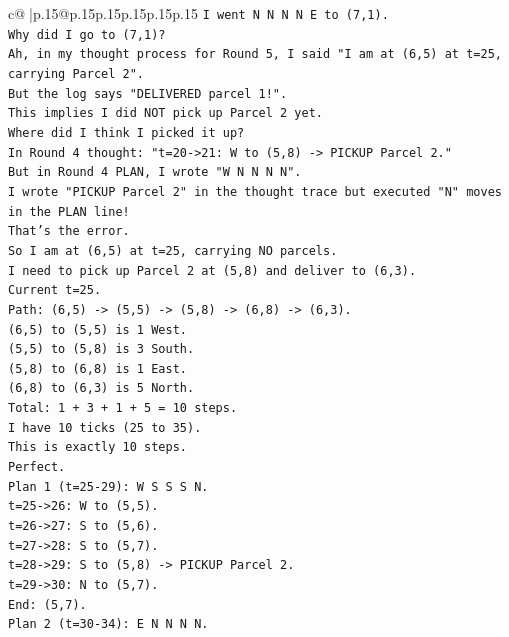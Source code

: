 \documentclass{article}
\begin{document}
{\begin{supertabular}{c@{$\;$}|p{.15\linewidth}@{}p{.15\linewidth}p{.15\linewidth}p{.15\linewidth}p{.15\linewidth}p{.15\linewidth}}
{{{\texttt{I went N N N N E to (7,1).} \\
\texttt{Why did I go to (7,1)?} \\
\texttt{Ah, in my thought process for Round 5, I said "I am at (6,5) at t=25, carrying Parcel 2".} \\
\texttt{But the log says "DELIVERED parcel 1!".} \\
\texttt{This implies I did NOT pick up Parcel 2 yet.} \\
\texttt{Where did I think I picked it up?} \\
\texttt{In Round 4 thought: "t=20{-}>21: W to (5,8) {-}> PICKUP Parcel 2."} \\
\texttt{But in Round 4 PLAN, I wrote "W N N N N".} \\
\texttt{I wrote "PICKUP Parcel 2" in the thought trace but executed "N" moves in the PLAN line!} \\
\texttt{That's the error.} \\
\texttt{So I am at (6,5) at t=25, carrying NO parcels.} \\
\texttt{I need to pick up Parcel 2 at (5,8) and deliver to (6,3).} \\
\texttt{Current t=25.} \\
\texttt{Path: (6,5) {-}> (5,5) {-}> (5,8) {-}> (6,8) {-}> (6,3).} \\
\texttt{(6,5) to (5,5) is 1 West.} \\
\texttt{(5,5) to (5,8) is 3 South.} \\
\texttt{(5,8) to (6,8) is 1 East.} \\
\texttt{(6,8) to (6,3) is 5 North.} \\
\texttt{Total: 1 + 3 + 1 + 5 = 10 steps.} \\
\texttt{I have 10 ticks (25 to 35).} \\
\texttt{This is exactly 10 steps.} \\
\texttt{Perfect.} \\
\texttt{Plan 1 (t=25{-}29): W S S S N.} \\
\texttt{t=25{-}>26: W to (5,5).} \\
\texttt{t=26{-}>27: S to (5,6).} \\
\texttt{t=27{-}>28: S to (5,7).} \\
\texttt{t=28{-}>29: S to (5,8) {-}> PICKUP Parcel 2.} \\
\texttt{t=29{-}>30: N to (5,7).} \\
\texttt{End: (5,7).} \\
\texttt{Plan 2 (t=30{-}34): E N N N N.} \\
}}}
\end{supertabular}}
\end{document}

